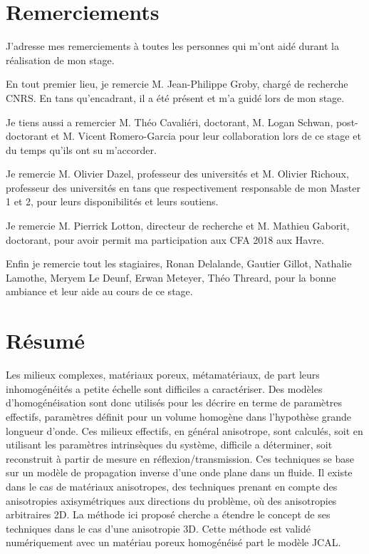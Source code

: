 \documentclass[twoside,openright]{report}
\begin{document}
\newpage
\section*{Remerciements}
    
    J'adresse mes remerciements à toutes les personnes qui m'ont aidé durant la réalisation de mon stage.
    
    
    En tout premier lieu, je remercie M. Jean-Philippe Groby, chargé de recherche CNRS. En tans qu'encadrant, il a été présent et m'a guidé lors de mon stage.
    
    
    Je tiens aussi a remercier M. Théo Cavaliéri, doctorant, M. Logan Schwan, post-doctorant et M. Vicent Romero-Garcia pour leur collaboration lors de ce stage et du temps qu'ils ont su m'accorder.
    
    
    Je remercie M. Olivier Dazel, professeur des universités et M. Olivier Richoux, professeur des universités en tans que respectivement responsable de mon Master 1 et 2, pour leurs disponibilités et leurs soutiens.
    
    
    Je remercie M. Pierrick Lotton, directeur de recherche et M. Mathieu Gaborit, doctorant, pour avoir permit ma participation aux CFA 2018 aux Havre.
    
    
    Enfin je remercie tout les stagiaires, Ronan Delalande, Gautier Gillot, Nathalie Lamothe, Meryem Le Deunf, Erwan Meteyer, Théo Threard,  pour la bonne ambiance et leur aide au cours de ce stage.
    
\newpage
\null
\newpage
\section*{Résumé}
    Les milieux complexes, matériaux poreux, métamatériaux, de part leurs inhomogénéités a petite échelle sont difficiles a caractériser. Des modèles d'homogénéisation sont donc utilisés pour les décrire en terme de paramètres effectifs, paramètres définit pour un volume homogène dans l'hypothèse grande longueur d'onde. Ces milieux effectifs, en général anisotrope, sont calculés, soit en utilisant les paramètres intrinsèques du système, difficile a déterminer, soit reconstruit à partir de mesure en réflexion/transmission. Ces techniques se base sur un modèle de propagation inverse d'une onde plane dans un fluide. Il existe dans le cas de matériaux anisotropes, des techniques prenant en compte des  anisotropies axisymétriques aux directions du problème, où des anisotropies arbitraires 2D.
    La méthode ici proposé cherche a étendre le concept de ses techniques dans le cas d'une anisotropie 3D. Cette méthode est validé numériquement avec un matériau poreux homogénéisé part le modèle JCAL.  
    
\end{document}
